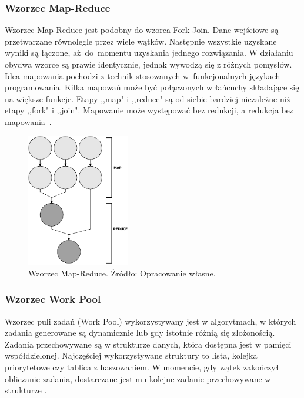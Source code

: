 \documentclass[12pt]{article}
\begin{document}
\subsubsection{Wzorzec Map-Reduce}
Wzorzec Map-Reduce jest podobny do wzorca Fork-Join. Dane wejściowe są przetwarzane równolegle przez wiele wątków.
Następnie wszystkie uzyskane wyniki są łączone, aż~do~momentu uzyskania jednego rozwiązania.
W działaniu obydwa wzorce są prawie identycznie, jednak wywodzą się z różnych pomysłów.
Idea mapowania pochodzi z technik stosowanych w~funkcjonalnych językach programowania.
Kilka mapowań może być połączonych w łańcuchy składające się na większe funkcje.
Etapy ,,map" i ,,reduce" są od siebie bardziej niezależne niż etapy ,,fork" i ,,join".
Mapowanie może występować bez redukcji, a redukcja bez mapowania~\cite{parallel-design-patterns}.

\begin{figure}[H]
    \centering
	\includegraphics[width=0.4\textwidth]{patterns-map-reduce.pdf}
    \caption{Wzorzec Map-Reduce. Źródło: Opracowanie własne.}
    \label{fig:map-reduce}
\end{figure}

\subsubsection{Wzorzec Work Pool}
Wzorzec puli zadań (Work Pool) wykorzystywany jest w algorytmach, w których zadania generowane są dynamicznie
lub gdy istotnie różnią się złożonością. Zadania przechowywane są w strukturze danych, która dostępna
jest w pamięci współdzielonej. Najczęściej wykorzystywane struktury to lista, kolejka priorytetowe
czy tablica z haszowaniem. W momencie, gdy wątek zakończył obliczanie zadania, dostarczane jest mu
kolejne zadanie przechowywane w strukturze \cite{wprowadzenie-do-obliczen-rownoleglych}.
\end{document}
